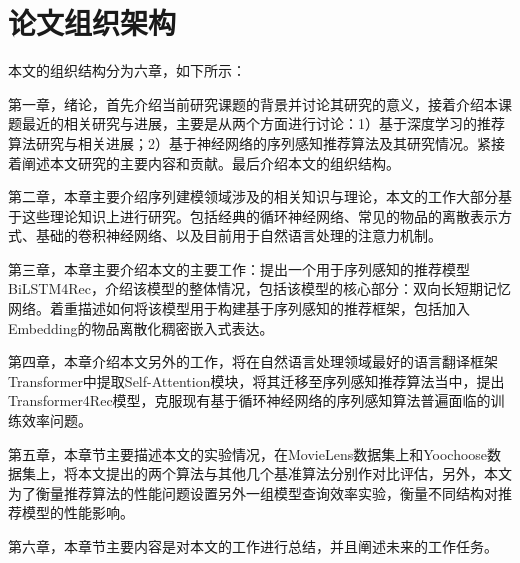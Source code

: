 \section{论文组织架构}
本文的组织结构分为六章，如下所示：

第一章，绪论，首先介绍当前研究课题的背景并讨论其研究的意义，接着介绍本课题最近的相关研究与进展，主要是从两个方面进行讨论：1）基于深度学习的推荐算法研究与相关进展；2）基于神经网络的序列感知推荐算法及其研究情况。紧接着阐述本文研究的主要内容和贡献。最后介绍本文的组织结构。

第二章，本章主要介绍序列建模领域涉及的相关知识与理论，本文的工作大部分基于这些理论知识上进行研究。包括经典的循环神经网络、常见的物品的离散表示方式、基础的卷积神经网络、以及目前用于自然语言处理的注意力机制。

第三章，本章主要介绍本文的主要工作：提出一个用于序列感知的推荐模型BiLSTM4Rec，介绍该模型的整体情况，包括该模型的核心部分：双向长短期记忆网络。着重描述如何将该模型用于构建基于序列感知的推荐框架，包括加入Embedding的物品离散化稠密嵌入式表达。


第四章，本章介绍本文另外的工作，将在自然语言处理领域最好的语言翻译框架Transformer中提取Self-Attention模块，将其迁移至序列感知推荐算法当中，提出Transformer4Rec模型，克服现有基于循环神经网络的序列感知算法普遍面临的训练效率问题。

第五章，本章节主要描述本文的实验情况，在MovieLens数据集上和Yoochoose数据集上，将本文提出的两个算法与其他几个基准算法分别作对比评估，另外，本文为了衡量推荐算法的性能问题设置另外一组模型查询效率实验，衡量不同结构对推荐模型的性能影响。

第六章，本章节主要内容是对本文的工作进行总结，并且阐述未来的工作任务。
